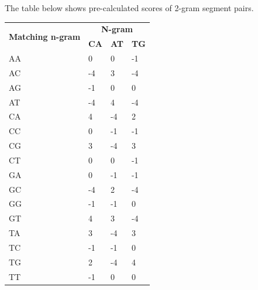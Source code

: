 \noindent
The table below shows pre-calculated scores of 2-gram segment pairs.
\begin{table}[H]
\small
\begin{tabular}{|l|l|l|l|}
\hline
\multirow{2}{*}{\textbf{Matching n-gram}} & \multicolumn{3}{c|}{\textbf{N-gram}}    \\ \cline{2-4} 
                                          & \textbf{CA} & \textbf{AT} & \textbf{TG} \\ \hline
AA                                        & 0           & 0           & -1          \\ \hline
AC                                        & -4          & 3           & -4          \\ \hline
AG                                        & -1          & 0           & 0           \\ \hline
AT                                        & -4          & 4           & -4          \\ \hline
CA                                        & 4           & -4          & 2           \\ \hline
CC                                        & 0           & -1          & -1          \\ \hline
CG                                        & 3           & -4          & 3           \\ \hline
CT                                        & 0           & 0           & -1          \\ \hline
GA                                        & 0           & -1          & -1          \\ \hline
GC                                        & -4          & 2           & -4          \\ \hline
GG                                        & -1          & -1          & 0           \\ \hline
GT                                        & 4           & 3           & -4          \\ \hline
TA                                        & 3           & -4          & 3           \\ \hline
TC                                        & -1          & -1          & 0           \\ \hline
TG                                        & 2           & -4          & 4           \\ \hline
TT                                        & -1          & 0           & 0           \\ \hline
\end{tabular}
\end{table}

\bigskip 

%
